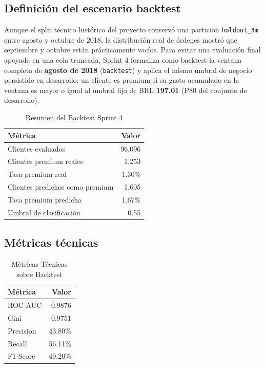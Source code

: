 \documentclass[journal,letterpaper]{IEEEtran}
\begin{document}
\subsection{Definición del escenario backtest}
Aunque el split técnico histórico del proyecto conservó una partición \texttt{holdout\_3m} entre agosto y octubre de 2018, la distribución real de órdenes mostró que septiembre y octubre están prácticamente vacíos. Para evitar una evaluación final apoyada en una cola truncada, Sprint 4 formaliza como backtest la ventana completa de \textbf{agosto de 2018} (\texttt{backtest}) y aplica el mismo umbral de negocio persistido en desarrollo: un cliente es premium si su gasto acumulado en la ventana es mayor o igual al umbral fijo de BRL \textbf{197.01} (P80 del conjunto de desarrollo).

\begin{table}[h]
\centering
\caption{Resumen del Backtest Sprint 4}
\label{tab:backtest_summary}
\begin{tabular}{lr}
\toprule
Métrica & Valor \\
\midrule
Clientes evaluados & 96,096 \\
Clientes premium reales & 1,253 \\
Tasa premium real & 1.30\% \\
Clientes predichos como premium & 1,605 \\
Tasa premium predicha & 1.67\% \\
Umbral de clasificación & 0.55 \\
\bottomrule
\end{tabular}
\end{table}

\subsection{Métricas técnicas}
\begin{table}[h]
\centering
\caption{Métricas Técnicas sobre Backtest}
\label{tab:backtest_metrics}
\begin{tabular}{lr}
\toprule
Métrica & Valor \\
\midrule
ROC-AUC & 0.9876 \\
Gini & 0.9751 \\
Precision & 43.80\% \\
Recall & 56.11\% \\
F1-Score & 49.20\% \\
\bottomrule
\end{tabular}
\end{table}
\end{document}
